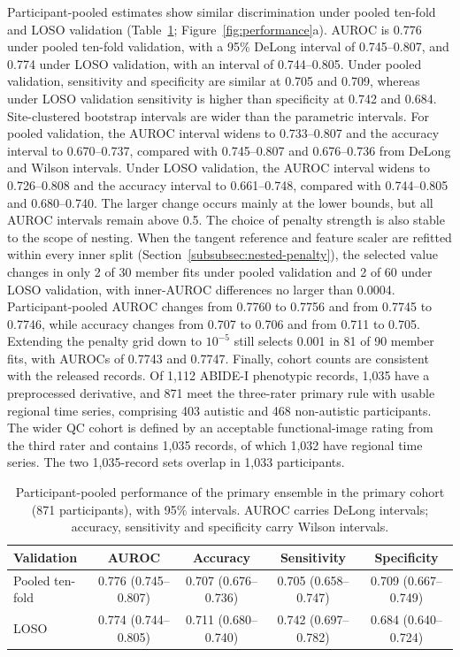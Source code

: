 Participant-pooled estimates show similar discrimination under pooled ten-fold and LOSO validation (Table~\ref{tab:performance}; Figure~\ref{fig:performance}a). AUROC is 0.776 under pooled ten-fold validation, with a 95\% DeLong interval of 0.745--0.807, and 0.774 under LOSO validation, with an interval of 0.744--0.805. Under pooled validation, sensitivity and specificity are similar at 0.705 and 0.709, whereas under LOSO validation sensitivity is higher than specificity at 0.742 and 0.684. Site-clustered bootstrap intervals are wider than the parametric intervals. For pooled validation, the AUROC interval widens to 0.733--0.807 and the accuracy interval to 0.670--0.737, compared with 0.745--0.807 and 0.676--0.736 from DeLong and Wilson intervals. Under LOSO validation, the AUROC interval widens to 0.726--0.808 and the accuracy interval to 0.661--0.748, compared with 0.744--0.805 and 0.680--0.740. The larger change occurs mainly at the lower bounds, but all AUROC intervals remain above 0.5. The choice of penalty strength is also stable to the scope of nesting. When the tangent reference and feature scaler are refitted within every inner split (Section~\ref{subsubsec:nested-penalty}), the selected value changes in only 2 of 30 member fits under pooled validation and 2 of 60 under LOSO validation, with inner-AUROC differences no larger than 0.0004. Participant-pooled AUROC changes from 0.7760 to 0.7756 and from 0.7745 to 0.7746, while accuracy changes from 0.707 to 0.706 and from 0.711 to 0.705. Extending the penalty grid down to $10^{-5}$ still selects 0.001 in 81 of 90 member fits, with AUROCs of 0.7743 and 0.7747. Finally, cohort counts are consistent with the released records. Of 1,112 ABIDE-I phenotypic records, 1,035 have a preprocessed derivative, and 871 meet the three-rater primary rule with usable regional time series, comprising 403 autistic and 468 non-autistic participants. The wider QC cohort is defined by an acceptable functional-image rating from the third rater and contains 1,035 records, of which 1,032 have regional time series. The two 1,035-record sets overlap in 1,033 participants.

\begin{table}[t]
\centering
\caption{Participant-pooled performance of the primary ensemble in the primary cohort
(871 participants), with 95\% intervals. AUROC carries DeLong intervals; accuracy,
sensitivity and specificity carry Wilson intervals.}
\label{tab:performance}
\small
\begin{tabular}{@{}lcccc@{}}
\toprule
Validation & AUROC & Accuracy & Sensitivity & Specificity \\
\midrule
Pooled ten-fold & 0.776 (0.745--0.807) & 0.707 (0.676--0.736) & 0.705 (0.658--0.747) & 0.709 (0.667--0.749) \\
LOSO & 0.774 (0.744--0.805) & 0.711 (0.680--0.740) & 0.742 (0.697--0.782) & 0.684 (0.640--0.724) \\
\bottomrule
\end{tabular}
\end{table}

